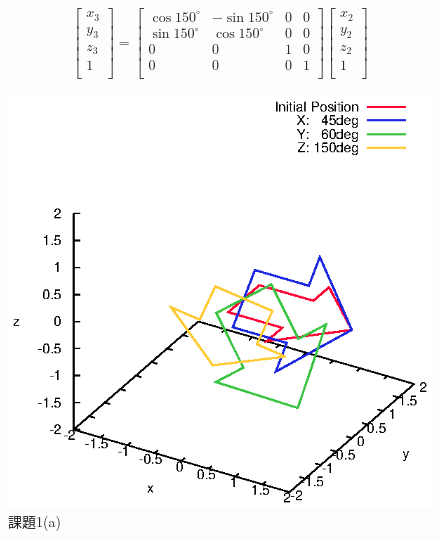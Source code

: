 \documentclass[a4paper,10pt]{jsarticle}
\begin{document}
\begin{eqnarray}
\label{eq:c}
  \left[
    \begin{array}{c}
      x_3\\
      y_3\\
      z_3\\
      1\\
    \end{array}
  \right] =
  \left[
    \begin{array}{cccc}
      \cos{150^\circ} & -\sin{150^\circ} & 0 & 0 \\
      \sin{150^\circ} & \cos{150^\circ} & 0 & 0\\
      0 & 0 & 1 & 0\\
      0 & 0 & 0 & 1\\
    \end{array}
  \right]\left[
    \begin{array}{c}
      x_2\\
      y_2\\
      z_2\\
      1\\
    \end{array}
  \right]
\end{eqnarray}

\begin{figure}[tb]
  \begin{center}
    \includegraphics[clip,width=14cm]{fig/eps/1(a).eps}
  \end{center}
  \caption{課題1(a)}
  \label{fig:課題1(a)}
\end{figure}
\end{document}
